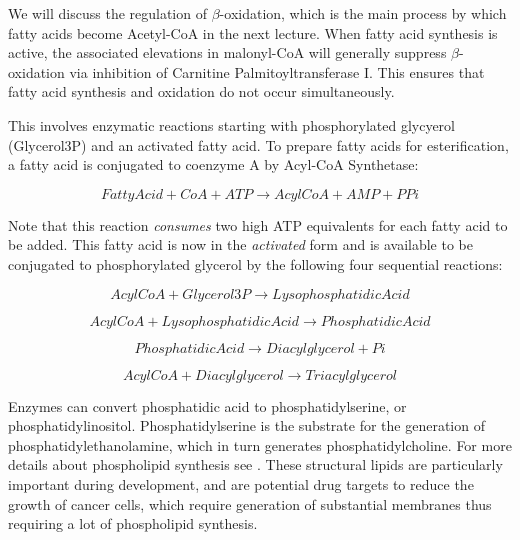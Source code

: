 \documentclass{tufte-handout}
\begin{document}
We will discuss the regulation of $\beta$-oxidation, which is the main process by which fatty acids become Acetyl-CoA in the next lecture.  When fatty acid synthesis is active, the associated elevations in malonyl-CoA will generally suppress $\beta$-oxidation via inhibition of Carnitine Palmitoyltransferase I.  This ensures that fatty acid synthesis and oxidation do not occur simultaneously.

  This involves enzymatic reactions starting with phosphorylated glycyerol (Glycerol3P) and an activated fatty acid.  To prepare fatty acids for esterification, a fatty acid is conjugated to coenzyme A by Acyl-CoA Synthetase:

\begin{equation}
Fatty Acid + CoA +  ATP \rightarrow AcylCoA + AMP + PPi
\end{equation}

Note that this reaction \emph{consumes} two high ATP equivalents for each fatty acid to be added.  This fatty acid is now in the \emph{activated} form and is available to be conjugated to phosphorylated glycerol by the following four sequential reactions:

\begin{equation}\label{eq:gpat}
AcylCoA + Glycerol3P \rightarrow Lysophosphatidic Acid
\end{equation}

\begin{equation}\label{eq:lpat}
AcylCoA + Lysophosphatidic Acid \rightarrow Phosphatidic Acid
\end{equation}

\begin{equation}\label{eq:lipin}
Phosphatidic Acid \rightarrow Diacylglycerol + Pi
\end{equation}

\begin{equation}\label{eq:dgat}
AcylCoA + Diacylglycerol \rightarrow Triacylglycerol
\end{equation}

  Enzymes can convert phosphatidic acid to phosphatidylserine, or phosphatidylinositol.  Phosphatidylserine is the substrate for the generation of phosphatidylethanolamine, which in turn generates phosphatidylcholine.  For more details about phospholipid synthesis see \citet{Kent1995}.  These structural lipids are particularly important during development, and are potential drug targets to reduce the growth of cancer cells, which require generation of substantial membranes thus requiring a lot of phospholipid synthesis.  
\end{document}
